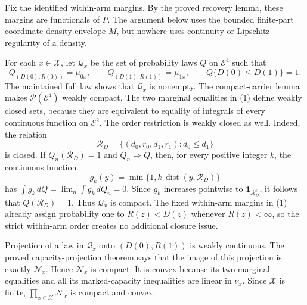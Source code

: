 Fix the identified within-arm margins.  By the proved recovery lemma, these margins are functionals of \(P\).  The argument below uses the bounded finite-part coordinate-density envelope \(M\), but nowhere uses continuity or Lipschitz regularity of a density.

For each \(x\in\mathcal X\), let \(\mathcal Q_x\) be the set of probability laws \(Q\) on \(\mathcal E^4\) such that
\[
 Q_{(D(0),R(0))}=\mu_{0x},\qquad
 Q_{(D(1),R(1))}=\mu_{1x},\qquad
 Q\{D(0)\leq D(1)\}=1. \tag{1}
\]
The maintained full law shows that \(\mathcal Q_x\) is nonempty.  The compact-carrier lemma makes \(\mathcal P(\mathcal E^4)\) weakly compact.  The two marginal equalities in (1) define weakly closed sets, because they are equivalent to equality of integrals of every continuous function on \(\mathcal E^2\).  The order restriction is weakly closed as well.  Indeed, the relation
\[
 \mathcal R_D=\{(d_0,r_0,d_1,r_1):d_0\leq d_1\}
\]
is closed.  If \(Q_n(\mathcal R_D)=1\) and \(Q_n\Rightarrow Q\), then, for every positive integer \(k\), the continuous function
\[
 g_k(y)=\min\{1,k\,\operatorname{dist}(y,\mathcal R_D)\}
\]
has \(\int g_k\,dQ=\lim_n\int g_k\,dQ_n=0\).  Since \(g_k\) increases pointwise to \(\mathbf 1_{\mathcal R_D^c}\), it follows that \(Q(\mathcal R_D)=1\).  Thus \(\mathcal Q_x\) is compact.  The fixed within-arm margins in (1) already assign probability one to \(R(z)<D(z)\) whenever \(R(z)<\infty\), so the strict within-arm order creates no additional closure issue.

Projection of a law in \(\mathcal Q_x\) onto \((D(0),R(1))\) is weakly continuous.  The proved capacity-projection theorem says that the image of this projection is exactly \(\mathcal N_x\).  Hence \(\mathcal N_x\) is compact.  It is convex because its two marginal equalities and all its marked-capacity inequalities are linear in \(\nu_x\).  Since \(\mathcal X\) is finite, \(\prod_{x\in\mathcal X}\mathcal N_x\) is compact and convex.

